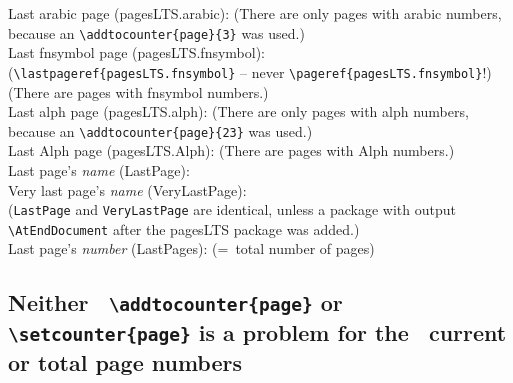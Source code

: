 \documentclass[british]{article}
\def\pagesLTSexampleArabic{3}
\def\pagesLTSexamplealph{23}
\begin{document}
\noindent Last arabic page (pagesLTS.arabic): 
(There are only  pages with arabic numbers,
because an \texttt{\textbackslash addtocounter\{page\}\{\pagesLTSexampleArabic\}} was used.)\\

\noindent Last fnsymbol page (pagesLTS.fnsymbol):  \\
(\texttt{\textbackslash lastpageref\{pagesLTS.fnsymbol\}} -- never
\texttt{\textbackslash pageref\{pagesLTS.fnsymbol\}}!)\\
(There are  pages with fnsymbol numbers.)\\

\noindent Last alph page (pagesLTS.alph): 
(There are only  pages with alph numbers,
because an \texttt{\textbackslash addtocounter\{page\}\{\pagesLTSexamplealph\}} was used.)\\

\noindent Last Alph page (pagesLTS.Alph): 
(There are  pages with Alph numbers.)\\

\noindent Last page's \textit{name} (LastPage): \\

\noindent Very last page's \textit{name} (VeryLastPage): \\
(\texttt{LastPage} and \texttt{VeryLastPage} are identical, unless
a package with output \linebreak
\texttt{\textbackslash AtEndDocument} after the \textsf{pagesLTS} package
was added.)\\

\noindent Last page's \textit{number} (LastPages): 
(=~total number of pages)\\

\lipsum[1-4]

\newpage

\subsection[addtocounter, setcounter]{Neither\ %
\texttt{\textbackslash addtocounter\{page\}} or\ %
\texttt{\textbackslash setcounter\{page\}} is a problem for the\ %
current or total page numbers}
\end{document}
